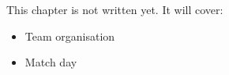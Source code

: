 \label{ch:rc5}
\begin{keyidea}
This chapter is not written yet. It will cover:
\begin{itemize}[nosep]
  \item Team organisation
  \item Match day
\end{itemize}
\end{keyidea}
